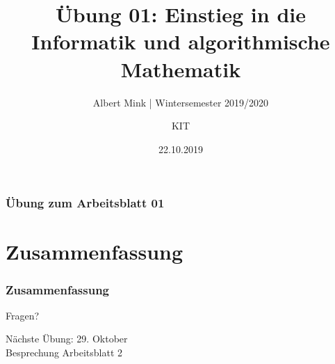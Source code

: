 \documentclass[c,18pt]{beamer}
\date{22.10.2019}
\title{Übung 01: Einstieg in die Informatik und algorithmische Mathematik}
\subtitle{Albert Mink | Wintersemester 2019/2020}
\author[Albert Mink, ]{KIT}
\institute[Institut für Angewandte und Numerische Mathematik (IANM)]{Institut für Angewandte und Numerische Mathematik}
\begin{document}
\begin{frame}
  \maketitle
\end{frame}

\begin{frame}
  \frametitle{Übung zum Arbeitsblatt 01}%
\tableofcontents[hideallsubsections]
\end{frame}

\def\kap{1}

\setcounter{exercise}{1}

\setcounter{exercise}{2}

\setcounter{exercise}{3}

\def\kap{2}%

\section{Zusammenfassung}
\begin{frame}
  \frametitle{Zusammenfassung}%
\tableofcontents[hideallsubsections]
\end{frame}

\begin{frame}
\centering
\Huge\textcolor{KITgreen}{Fragen?}
\vspace{2cm}

{\LARGE
Nächste Übung: 29. Oktober\\
Besprechung Arbeitsblatt 2
}
\end{frame}


\end{document}
